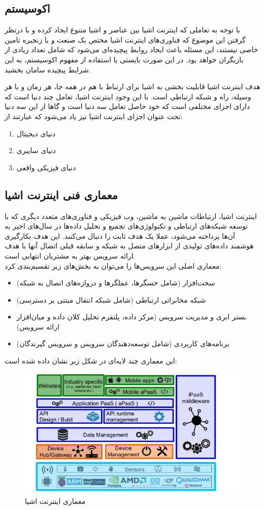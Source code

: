 \subsection{اکوسیستم}
با توجه به تعاملی که اینترنت اشیا بین عناصر و اشیا متنوع ایجاد کرده و با درنظر گرفتن این موضوع که فناوری‌های اینترنت اشیا مختص یک صنعت و یا زنجیره تامین خاصی نیستند، این مسئله باعث ایجاد روابط پیچیده‌ای می‌شود که شامل تعداد زیادی از بازیگران خواهد بود. در این صورت بایستی با استفاده از مفهوم اکوسیستم، به این شرایط پیچیده سامان بخشید.


هدف اینترنت اشیا قابلیت‌ بخشی به اشیا برای ارتباط با هم در همه جا، هر زمان و با هر وسیله، راه و شبكه‌ ارتباطی است. با این وجود اینترنت اشیا، تعامل چند دنیا است که دارای اجزای مختلفی است که خود حاصل تعامل سه دنیا است و گاها از این سه دنیا تحت عنوان اجزای اینترنت اشیا نیز یاد می‌شود که عبارتند از:
\begin{enumerate}
	\item دنیای دیجیتال
	\item دنیای سایبری
	\item دنیای فیزیکی واقعی
\end{enumerate}
\subsection{معماری فنی اینترنت اشیا}
اینترنت اشیا، ارتباطات ماشین به ماشین، وب فیزیكی و فناوری‌های متعدد دیگری که با توسعه شبكه‌های ارتباطی و تكنولوژی‌های تجمیع و تحلیل داده‌ها در سال‌های اخیر به آن‌ها پرداخته می‌شود، عملا یک هدف ثابت را دنبال می‌کنند. این هدف بكارگیری هوشمند داده‌های تولیدی از ابزارهای متصل به شبكه و سابقه قبلی اتصال آنها با هدف ارائه سرویس بهتر به مشتریان انتهایی است.\\
 معماری اصلی این سرویس‌ها را می‌توان به بخش‌های زیر تقسیم‌بندی کرد:
\begin{itemize}
	\item سخت‌افزار (شامل حسگرها، عملگرها و دروازه‌های اتصال به شبکه)
	\item شبکه مخابراتی ارتباطی (شامل شبکه انتقال مبتنی بر دسترسی)
	\item بستر ابری و مدیریت سرویس (مرکز داده، پلتفرم تحلیل کلان داده و میان‌افزار ارائه سرویس)
	\item برنامه‌های کاربردی (شامل توسعه‌دهندگان سرویس و سرویس گیرندگان)
\end{itemize}
این معماری چند لایه‌ای در شكل زیر نشان داده شده است:\\
\begin{figure}[!h]
	\centerline{\includegraphics[width=.8\textwidth]{iot-arc}}
	\caption{معماری اینترنت اشیا \cite{iot-arc}}
\end{figure}

